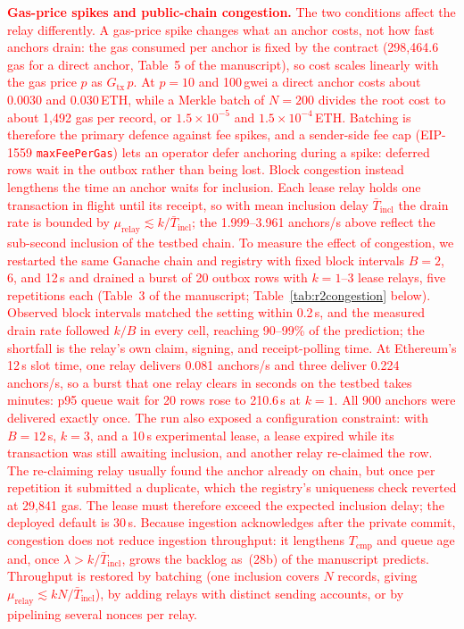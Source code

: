 \documentclass[11pt]{article}
\begin{document}
\textcolor{red}{\textbf{Gas-price spikes and public-chain congestion.} The two conditions affect the relay differently. A gas-price spike changes what an anchor costs, not how fast anchors drain: the gas consumed per anchor is fixed by the contract (298{,}464.6 gas for a direct anchor, Table~5 of the manuscript), so cost scales linearly with the gas price $p$ as $G_{\mathrm{tx}}\,p$. At $p=10$ and 100\,gwei a direct anchor costs about 0.0030 and 0.030\,ETH, while a Merkle batch of $N=200$ divides the root cost to about 1{,}492 gas per record, or $1.5\times10^{-5}$ and $1.5\times10^{-4}$\,ETH. Batching is therefore the primary defence against fee spikes, and a sender-side fee cap (EIP-1559 \texttt{maxFeePerGas}) lets an operator defer anchoring during a spike: deferred rows wait in the outbox rather than being lost. Block congestion instead lengthens the time an anchor waits for inclusion. Each lease relay holds one transaction in flight until its receipt, so with mean inclusion delay $\bar{T}_{\mathrm{incl}}$ the drain rate is bounded by $\mu_{\mathrm{relay}}\lesssim k/\bar{T}_{\mathrm{incl}}$; the 1.999--3.961 anchors/s above reflect the sub-second inclusion of the testbed chain. To measure the effect of congestion, we restarted the same Ganache chain and registry with fixed block intervals $B=2$, 6, and 12\,s and drained a burst of 20 outbox rows with $k=1$--3 lease relays, five repetitions each (Table~3 of the manuscript; Table~\ref{tab:r2congestion} below). Observed block intervals matched the setting within 0.2\,s, and the measured drain rate followed $k/B$ in every cell, reaching 90--99\% of the prediction; the shortfall is the relay's own claim, signing, and receipt-polling time. At Ethereum's 12\,s slot time, one relay delivers 0.081 anchors/s and three deliver 0.224 anchors/s, so a burst that one relay clears in seconds on the testbed takes minutes: p95 queue wait for 20 rows rose to 210.6\,s at $k=1$. All 900 anchors were delivered exactly once. The run also exposed a configuration constraint: with $B=12$\,s, $k=3$, and a 10\,s experimental lease, a lease expired while its transaction was still awaiting inclusion, and another relay re-claimed the row. The re-claiming relay usually found the anchor already on chain, but once per repetition it submitted a duplicate, which the registry's uniqueness check reverted at 29{,}841 gas. The lease must therefore exceed the expected inclusion delay; the deployed default is 30\,s. Because ingestion acknowledges after the private commit, congestion does not reduce ingestion throughput: it lengthens $T_{\mathrm{cmp}}$ and queue age and, once $\lambda>k/\bar{T}_{\mathrm{incl}}$, grows the backlog as~(28b) of the manuscript predicts. Throughput is restored by batching (one inclusion covers $N$ records, giving $\mu_{\mathrm{relay}}\lesssim kN/\bar{T}_{\mathrm{incl}}$), by adding relays with distinct sending accounts, or by pipelining several nonces per relay.}
\end{document}
